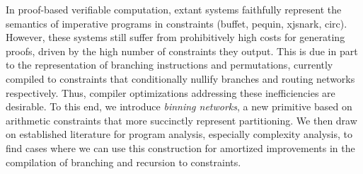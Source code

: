 In proof-based verifiable computation, extant systems faithfully represent the semantics of imperative programs in constraints (buffet, pequin, xjsnark, circ).
However, these systems still suffer from prohibitively high costs for generating proofs, driven by the high number of constraints they output.
This is due in part to the representation of branching instructions and permutations, currently compiled to constraints that conditionally nullify branches and routing networks respectively.
Thus, compiler optimizations addressing these inefficiencies are desirable.
To this end, we introduce \textit{binning networks},
a new primitive based on arithmetic constraints that more succinctly represent partitioning. We then draw on established literature for program analysis, especially complexity analysis,
to find cases where we can use this construction for amortized improvements in the compilation of branching and recursion to constraints.
